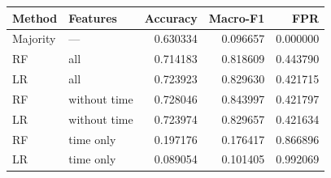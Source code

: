 \begin{tabular}{llrrr}
\toprule
Method & Features & Accuracy & Macro-F1 & FPR \\
\midrule
Majority & --- & 0.630334 & 0.096657 & 0.000000 \\
RF & all & 0.714183 & 0.818609 & 0.443790 \\
LR & all & 0.723923 & 0.829630 & 0.421715 \\
RF & without time & 0.728046 & 0.843997 & 0.421797 \\
LR & without time & 0.723974 & 0.829657 & 0.421634 \\
RF & time only & 0.197176 & 0.176417 & 0.866896 \\
LR & time only & 0.089054 & 0.101405 & 0.992069 \\
\bottomrule
\end{tabular}
